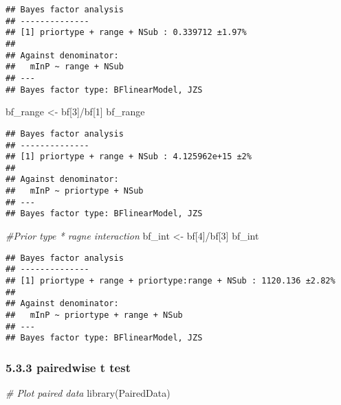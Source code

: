 \documentclass[
]{article}
\newenvironment{Shaded}{\begin{snugshade}}{\end{snugshade}}
\newcommand{\CommentTok}[1]{\textcolor[rgb]{0.56,0.35,0.01}{\textit{#1}}}
\newcommand{\DecValTok}[1]{\textcolor[rgb]{0.00,0.00,0.81}{#1}}
\newcommand{\FunctionTok}[1]{\textcolor[rgb]{0.00,0.00,0.00}{#1}}
\newcommand{\NormalTok}[1]{#1}
\newcommand{\OtherTok}[1]{\textcolor[rgb]{0.56,0.35,0.01}{#1}}
\newcommand{\SpecialCharTok}[1]{\textcolor[rgb]{0.00,0.00,0.00}{#1}}
\begin{document}
\begin{verbatim}
## Bayes factor analysis
## --------------
## [1] priortype + range + NSub : 0.339712 ±1.97%
## 
## Against denominator:
##   mInP ~ range + NSub 
## ---
## Bayes factor type: BFlinearModel, JZS
\end{verbatim}

\begin{Shaded}
\begin{Highlighting}[]
\NormalTok{bf\_range }\OtherTok{\textless{}{-}}\NormalTok{ bf[}\DecValTok{3}\NormalTok{]}\SpecialCharTok{/}\NormalTok{bf[}\DecValTok{1}\NormalTok{]}
\NormalTok{bf\_range}
\end{Highlighting}
\end{Shaded}

\begin{verbatim}
## Bayes factor analysis
## --------------
## [1] priortype + range + NSub : 4.125962e+15 ±2%
## 
## Against denominator:
##   mInP ~ priortype + NSub 
## ---
## Bayes factor type: BFlinearModel, JZS
\end{verbatim}

\begin{Shaded}
\begin{Highlighting}[]
\CommentTok{\#Prior type * ragne interaction }
\NormalTok{bf\_int }\OtherTok{\textless{}{-}}\NormalTok{ bf[}\DecValTok{4}\NormalTok{]}\SpecialCharTok{/}\NormalTok{bf[}\DecValTok{3}\NormalTok{] }
\NormalTok{bf\_int}
\end{Highlighting}
\end{Shaded}

\begin{verbatim}
## Bayes factor analysis
## --------------
## [1] priortype + range + priortype:range + NSub : 1120.136 ±2.82%
## 
## Against denominator:
##   mInP ~ priortype + range + NSub 
## ---
## Bayes factor type: BFlinearModel, JZS
\end{verbatim}

\hypertarget{pairedwise-t-test}{%
\subsubsection{5.3.3 pairedwise t test}\label{pairedwise-t-test}}

\begin{Shaded}
\begin{Highlighting}[]
\CommentTok{\# Plot paired data}
\FunctionTok{library}\NormalTok{(PairedData)}
\end{Highlighting}
\end{Shaded}
\end{document}
